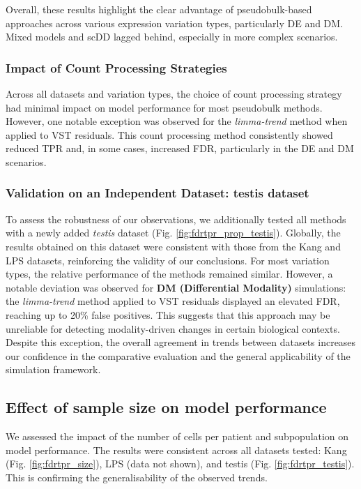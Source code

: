 \documentclass[a4paper, 11pt, twocolumn]{article}
\begin{document}
\begin{multicols}{2}
Overall, these results highlight the clear advantage of pseudobulk-based approaches across various expression variation types, particularly DE and DM. Mixed models and scDD lagged behind, especially in more complex scenarios.

\subsubsection{Impact of Count Processing Strategies}
Across all datasets and variation types, the choice of count processing strategy had minimal impact on model performance for most pseudobulk methods. However, one notable exception was observed for the \textit{limma-trend} method when applied to VST residuals. This count processing method consistently showed reduced TPR and, in some cases, increased FDR, particularly in the DE and DM scenarios.

\subsubsection{Validation on an Independent Dataset: testis dataset} 
To assess the robustness of our observations, we additionally tested all methods with a newly added \textit{testis} dataset (Fig. \ref{fig:fdrtpr_prop_testis}). Globally, the results obtained on this dataset were consistent with those from the Kang and LPS datasets, reinforcing the validity of our conclusions. For most variation types, the relative performance of the methods remained similar. However, a notable deviation was observed for \textbf{DM (Differential Modality)} simulations: the \textit{limma-trend} method applied to VST residuals displayed an elevated FDR, reaching up to 20\% false positives. This suggests that this approach may be unreliable for detecting modality-driven changes in certain biological contexts. Despite this exception, the overall agreement in trends between datasets increases our confidence in the comparative evaluation and the general applicability of the simulation framework.


\subsection{Effect of sample size on model performance}

We assessed the impact of the number of cells per patient and subpopulation on model performance. The results were consistent across all datasets tested: Kang (Fig. \ref{fig:fdrtpr_size}), LPS (data not shown), and testis (Fig. \ref{fig:fdrtpr_testis}). This is confirming the generalisability of the observed trends.


\end{multicols}
\end{document}
